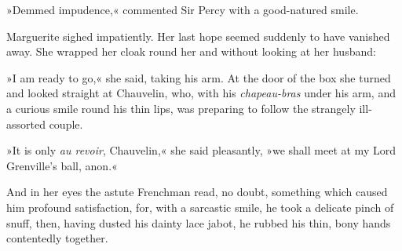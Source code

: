 »Demmed impudence,« commented Sir Percy with a good-\allowbreak natured smile.

Marguerite sighed impatiently. Her last hope seemed suddenly to have vanished away. She wrapped her cloak round her and without looking at her husband:

»I am ready to go,« she said, taking his arm. At the door of the box she turned and looked straight at Chauvelin, who, with his \textit{chapeau-bras} under his arm, and a curious smile round his thin lips, was preparing to follow the strangely ill-assorted couple.

»It is only \textit{au revoir}, Chauvelin,« she said pleasantly, »we shall meet at my Lord Grenville's ball, anon.«

And in her eyes the astute Frenchman read, no doubt, something which caused him profound satisfaction, for, with a sarcastic smile, he took a delicate pinch of snuff, then, having dusted his dainty lace jabot, he rubbed his thin, bony hands contentedly together.